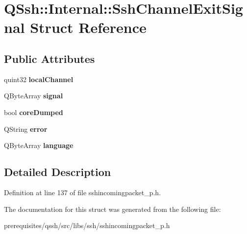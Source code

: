 \hypertarget{struct_q_ssh_1_1_internal_1_1_ssh_channel_exit_signal}{}\section{Q\+Ssh\+:\+:Internal\+:\+:Ssh\+Channel\+Exit\+Signal Struct Reference}
\label{struct_q_ssh_1_1_internal_1_1_ssh_channel_exit_signal}
\subsection*{Public Attributes}
\begin{DoxyCompactItemize}
\item 
\mbox{\label{struct_q_ssh_1_1_internal_1_1_ssh_channel_exit_signal_a488e403c9714b8a6fea47c48bfebcaf2}} 
quint32 {\bfseries local\+Channel}
\item 
\mbox{\label{struct_q_ssh_1_1_internal_1_1_ssh_channel_exit_signal_a4821cb96345e8033a994169bc9f04374}} 
Q\+Byte\+Array {\bfseries signal}
\item 
\mbox{\label{struct_q_ssh_1_1_internal_1_1_ssh_channel_exit_signal_ab9e6603ab2a8e43311644ef75386e7fc}} 
bool {\bfseries core\+Dumped}
\item 
\mbox{\label{struct_q_ssh_1_1_internal_1_1_ssh_channel_exit_signal_a2f6696a692c44b542db1f29d9f310108}} 
Q\+String {\bfseries error}
\item 
\mbox{\label{struct_q_ssh_1_1_internal_1_1_ssh_channel_exit_signal_a43ef702e7eae6021a2ec010ec0ba0f1d}} 
Q\+Byte\+Array {\bfseries language}
\end{DoxyCompactItemize}


\subsection{Detailed Description}


Definition at line 137 of file sshincomingpacket\+\_\+p.\+h.



The documentation for this struct was generated from the following file\+:\begin{DoxyCompactItemize}
\item 
prerequisites/qssh/src/libs/ssh/sshincomingpacket\+\_\+p.\+h\end{DoxyCompactItemize}
